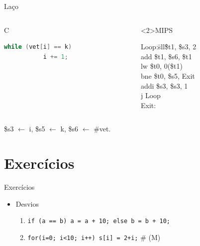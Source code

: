 \begin{frame}[fragile]{Laço}
\begin{columns}
\begin{column}{.35\textwidth}
  \begin{block}{C}
    \begin{lstlisting}[language=C]
      while (vet[i] == k)
           i += 1;
    \end{lstlisting}
  \end{block}
\end{column}  
\begin{column}{.55\textwidth}
  \begin{block}<2>{MIPS}
    \begin{tt}
    \begin{tabbing}
      Loop:\hspace{1cm}\= sll\hspace{0.5cm}\=\$t1, \$s3, 2\\
      \>add \>\$t1, \$s6, \$t1 \\
      \>lw \>\$t0, 0(\$t1)\\
      \>bne \>\$t0, \$s5, Exit\\
      \>addi \>\$s3, \$s3, 1\\
      \>j \>Loop\\
      Exit:\\
    \end{tabbing}
  \end{tt}
  \end{block}
\end{column}
\end{columns}

\vfill\footnotesize
\$s3 $\leftarrow$ i, 
\$s5 $\leftarrow$ k, 
\$s6 $\leftarrow$ \#vet.
\end{frame}

\section{Exercícios}

\def\mem{{\footnotesize\color{gray}\# (M)}}
\begin{frame}{Exercícios}
  \large
  \begin{itemize}
  
  \item Desvios
    \begin{enumerate}
    \item {\tt if (a == b) a = a + 10; else b = b + 10;}
    \item {\tt for(i=0; i<10; i++) s[i] = 2+i;} \mem
    \end{enumerate}

  \end{itemize}

\end{frame}

